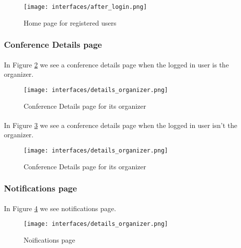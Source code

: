			\begin{figure}[b]
				\centering
				\texttt{[image: interfaces/after\_login.png]}
				\caption{Home page for registered users}
				\label{fig:home-after-login}
			\end{figure}

	\subsubsection{Conference Details page}
		\paragraph{}
		In Figure \ref{fig:details-organizer} we see a conference details page when the logged in user is the organizer.
		
			\begin{figure}[b]
				\centering
				\texttt{[image: interfaces/details\_organizer.png]}
				\caption{Conference Details page for its organizer}
				\label{fig:details-organizer}
			\end{figure}

		\paragraph{}
		In Figure \ref{fig:details-non-organizer} we see a conference details page when the logged in user isn't the organizer.
		
			\begin{figure}[b]
				\centering
				\texttt{[image: interfaces/details\_organizer.png]}
				\caption{Conference Details page for its organizer}
				\label{fig:details-non-organizer}
			\end{figure}

	\subsubsection{Notifications page}
		\paragraph{}
		In Figure \ref{fig:notifications} we see notifications page.
		
			\begin{figure}
				\centering
				\texttt{[image: interfaces/details\_organizer.png]}
				\caption{Noifications page}
				\label{fig:notifications}
			\end{figure}

